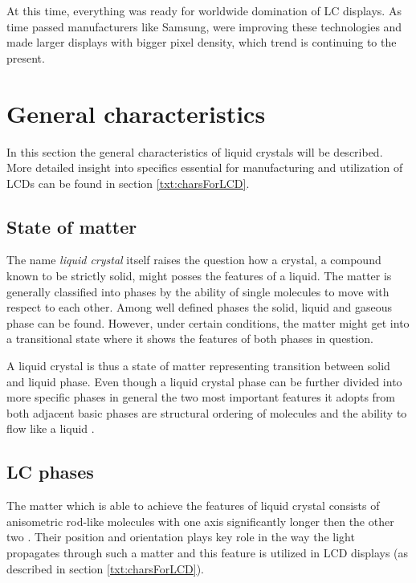 At this time, everything was ready for worldwide domination of LC displays. As time passed manufacturers like Samsung, were improving these technologies and made larger displays with bigger pixel density, which trend is continuing to the present.

\section{General characteristics}
\label{sec:genchar}
In this section the general characteristics of liquid crystals will be described. More detailed insight into specifics essential for manufacturing and utilization of LCDs can be found in section \ref{txt:charsForLCD}.

\subsection{State of matter}
The name \textit{liquid crystal} itself raises the question how a crystal, a compound known to be strictly solid, might posses the features of a liquid. The matter is generally classified into phases by the ability of single molecules to move with respect to each other. Among well defined phases the solid, liquid and gaseous phase can be found. However, under certain conditions, the matter might get into a transitional state where it shows the features of both phases in question. 

A liquid crystal is thus a state of matter representing transition between solid and liquid phase. Even though a liquid crystal phase can be further divided into more specific phases in general the two most important features it adopts from both adjacent basic phases are structural ordering of molecules and the ability to flow like a liquid \cite{Fujitsu2006Online}.

\subsection{LC phases} \label{txt:lcPhases}
The matter which is able to achieve the features of liquid crystal consists of anisometric rod-like molecules with one axis significantly longer then the other two \cite{Gu2011WorldofLCD}. Their position and orientation plays key role in the way the light propagates through such a matter and this feature is utilized in LCD displays (as described in section \ref{txt:charsForLCD}).

